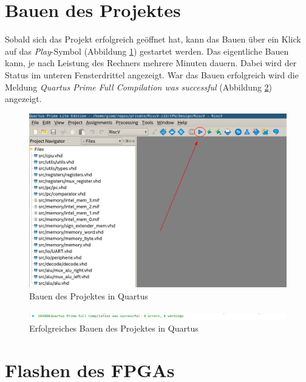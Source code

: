     \section{Bauen des Projektes}
        Sobald sich das Projekt erfolgreich geöffnet hat, kann das Bauen über ein Klick
        auf das \textit{Play}-Symbol (Abbildung \ref{fig:quartus_play}) gestartet werden. Das eigentliche Bauen kann, je nach
        Leistung des Rechners mehrere Minuten dauern. Dabei wird der Status im unteren
        Fensterdrittel angezeigt. War das Bauen erfolgreich wird die Meldung
        \textit{Quartus Prime Full Compilation was successful} (Abbildung \ref{fig:quartus_build_sucessful})
        angezeigt.

        \begin{figure}[H]
            \centering
            \includegraphics[scale=0.6]{img/quartus_build.png}
            \caption{Bauen des Projektes in Quartus}
            \label{fig:quartus_play}
        \end{figure}

        \begin{figure}[H]
            \centering
            \includegraphics[scale=0.6]{img/quartus_build_sucessfull.png}
            \caption{Erfolgreiches Bauen des Projektes in Quartus}
            \label{fig:quartus_build_sucessful}
        \end{figure}


    \section{Flashen des FPGAs}\label{lab:flash-fpga}

